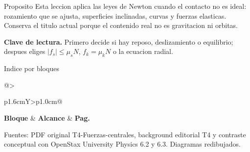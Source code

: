 \documentclass[10pt,a4paper]{article}
\begin{document}
\shorthandoff{<>}
\color{Ink}


\begin{lessoncard}{Proposito}
Esta leccion aplica las leyes de Newton cuando el contacto no es ideal: rozamiento que se ajusta, superficies inclinadas, curvas y fuerzas elasticas. Conserva el titulo actual porque el contenido real no es gravitacion ni orbitas.
\begin{keybox}
\textbf{Clave de lectura.} Primero decide si hay reposo, deslizamiento o equilibrio; despues eliges $|f_s|\le \mu_sN$, $f_k=\mu_kN$ o la ecuacion radial.
\end{keybox}
\end{lessoncard}

\begin{lessoncard}{Indice por bloques}
\footnotesize
\begin{tabularx}{\linewidth}{@{}>{\raggedright\arraybackslash}p{1.6cm}Y>{\raggedleft\arraybackslash\bfseries}p{1.0cm}@{}}
\textbf{Bloque} & \textbf{Alcance} & \textbf{Pag.}\\
\midrule
{}
\end{tabularx}
\end{lessoncard}

{\scriptsize\textcolor{Muted}{Fuentes: PDF original T4-Fuerzas-centrales, background editorial T4 y contraste conceptual con OpenStax University Physics 6.2 y 6.3. Diagramas redibujados.}}

\clearpage
\end{document}
